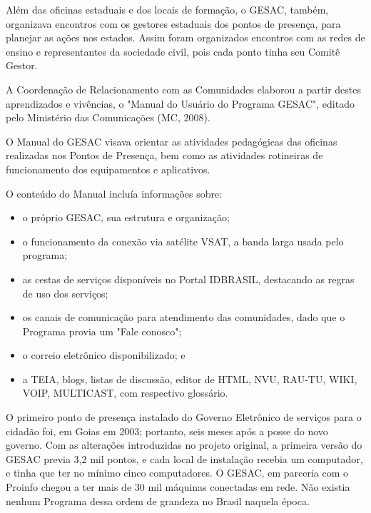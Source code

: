 Além das oficinas estaduais e dos locais de formação, o GESAC, também, organizava encontros com os gestores estaduais dos pontos de presença, para planejar as ações nos estados. Assim foram organizados encontros com as redes de ensino e  representantes da sociedade civil, pois cada ponto  tinha seu Comitê Gestor.

A Coordenação de Relacionamento com as Comunidades elaborou a partir destes aprendizados e vivências, o "Manual do Usuário do Programa GESAC", editado pelo Ministério das Comunicações (MC, 2008).

O Manual do GESAC visava  orientar as atividades pedagógicas das oficinas realizadas nos Pontos de Presença, bem como as  atividades rotineiras de funcionamento dos equipamentos e aplicativos.

O conteúdo do Manual incluía informações sobre:


\begin{itemize}
\item o próprio GESAC, sua estrutura e organização;
\item o funcionamento da conexão via satélite VSAT, a banda larga usada pelo programa;
\item as cestas de serviços disponíveis no Portal IDBRASIL, destacando as regras de uso dos serviços;
\item os canais de comunicação para atendimento das comunidades, dado que o Programa provia um "Fale conosco";
\item  o correio eletrônico disponibilizado; e
\item a TEIA, blogs, listas de discussão, editor de HTML, NVU, RAU-TU, WIKI, VOIP, MULTICAST, com respectivo glossário.
\end{itemize}


\noindent\begin{flushright}\mbox{\linespread{1}\selectfont\centering{}}\end{flushright}


O primeiro ponto de presença instalado do Governo Eletrônico de serviços para o cidadão foi, em Goias em 2003; portanto, seis meses após a posse do novo governo. Com as alterações introduzidas no projeto original, a primeira versão do GESAC previa 3,2 mil pontos, e cada local de instalação recebia um computador, e tinha que ter no mínimo cinco computadores. O GESAC, em parceria com o Proinfo chegou a ter mais de 30 mil máquinas conectadas em rede. Não existia nenhum Programa dessa ordem de grandeza no Brasil naquela época.

